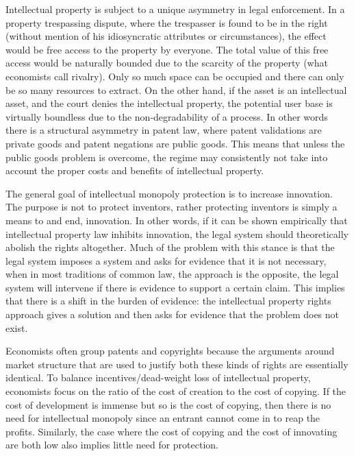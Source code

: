 Intellectual property is subject to a unique asymmetry in legal enforcement. In a property trespassing dispute, where the trespasser is found to be in the right (without mention of his idiosyncratic attributes or circumstances), the effect would be free access to the property by everyone. The total value of this free access would be naturally bounded due to the scarcity of the property (what economists call rivalry). Only so much space can be occupied and there can only be so many resources to extract. On the other hand, if the asset is an intellectual asset, and the court denies the intellectual property, the potential user base is virtually boundless due to the non-degradability of a process. In other words there is a structural asymmetry in patent law, where patent validations are private goods and patent negations are public goods. This means that unless the public goods problem is overcome, the regime may consistently not take into account the proper costs and benefits of intellectual property.

The general goal of intellectual monopoly protection is to increase innovation. The purpose is not to protect inventors, rather protecting inventors is simply a means to and end, innovation. In other words, if it can be shown empirically that intellectual property law inhibits innovation, the legal system should theoretically abolish the rights altogether. Much of the problem with this stance is that the legal system imposes a system and asks for evidence that it is not necessary, when in most traditions of common law, the approach is the opposite, the legal system will intervene if there is evidence to support a certain claim. This implies that there is a shift in the burden of evidence: the intellectual property rights approach gives a solution and then asks for evidence that the problem does not exist. 


Economists often group patents and copyrights because the arguments around market structure that are used to justify both these kinds of rights are essentially identical. To balance incentives/dead-weight loss of intellectual property, economists focus on the ratio of the cost of creation to the cost of copying. If the cost of development is immense but so is the cost of copying, then there is no need for intellectual monopoly since an entrant cannot come in to reap the profits. Similarly, the case where the cost of copying and the cost of innovating are both low also implies little need for protection. 


